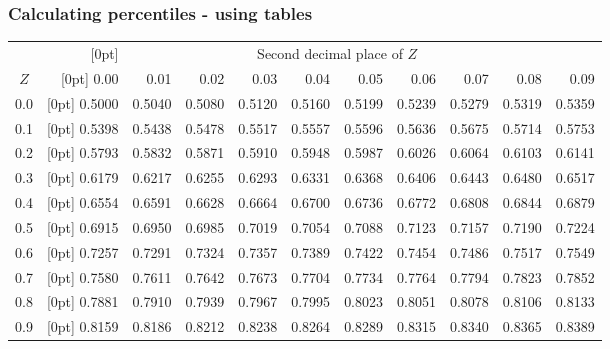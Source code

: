
\begin{frame}[fragile]
\frametitle{Calculating percentiles - using tables}

{\footnotesize
\begin{tabular}{c | >{\columncolor[gray]{0.6}[0pt]}rrrrr | rrrrr |}
  \cline{2-11}
&&&& \multicolumn{4}{c}{Second decimal place of $Z$} &&& \\
  \cline{2-11}
$Z$ & 0.00 & 0.01 & 0.02 & 0.03 & 0.04 & 0.05 & 0.06 & 0.07 & 0.08 & 0.09 \\
  \hline
  \hline
0.0 & \tiny{0.5000} & \tiny{0.5040} & \tiny{0.5080} & \tiny{0.5120} & \tiny{0.5160} & \tiny{0.5199} & \tiny{0.5239} & \tiny{0.5279} & \tiny{0.5319} & \tiny{0.5359} \\
  0.1 & \tiny{0.5398} & \tiny{0.5438} & \tiny{0.5478} & \tiny{0.5517} & \tiny{0.5557} & \tiny{0.5596} & \tiny{0.5636} & \tiny{0.5675} & \tiny{0.5714} & \tiny{0.5753} \\
  0.2 & \tiny{0.5793} & \tiny{0.5832} & \tiny{0.5871} & \tiny{0.5910} & \tiny{0.5948} & \tiny{0.5987} & \tiny{0.6026} & \tiny{0.6064} & \tiny{0.6103} & \tiny{0.6141} \\
  0.3 & \tiny{0.6179} & \tiny{0.6217} & \tiny{0.6255} & \tiny{0.6293} & \tiny{0.6331} & \tiny{0.6368} & \tiny{0.6406} & \tiny{0.6443} & \tiny{0.6480} & \tiny{0.6517} \\
  0.4 & \tiny{0.6554} & \tiny{0.6591} & \tiny{0.6628} & \tiny{0.6664} & \tiny{0.6700} & \tiny{0.6736} & \tiny{0.6772} & \tiny{0.6808} & \tiny{0.6844} & \tiny{0.6879} \\
  \hline
  0.5 & \tiny{0.6915} & \tiny{0.6950} & \tiny{0.6985} & \tiny{0.7019} & \tiny{0.7054} & \tiny{0.7088} & \tiny{0.7123} & \tiny{0.7157} & \tiny{0.7190} & \tiny{0.7224} \\
  0.6 & \tiny{0.7257} & \tiny{0.7291} & \tiny{0.7324} & \tiny{0.7357} & \tiny{0.7389} & \tiny{0.7422} & \tiny{0.7454} & \tiny{0.7486} & \tiny{0.7517} & \tiny{0.7549} \\
  0.7 & \tiny{0.7580} & \tiny{0.7611} & \tiny{0.7642} & \tiny{0.7673} & \tiny{0.7704} & \tiny{0.7734} & \tiny{0.7764} & \tiny{0.7794} & \tiny{0.7823} & \tiny{0.7852} \\
  0.8 & \tiny{0.7881} & \tiny{0.7910} & \tiny{0.7939} & \tiny{0.7967} & \tiny{0.7995} & \tiny{0.8023} & \tiny{0.8051} & \tiny{0.8078} & \tiny{0.8106} & \tiny{0.8133} \\
  0.9 & \tiny{0.8159} & \tiny{0.8186} & \tiny{0.8212} & \tiny{0.8238} & \tiny{0.8264} & \tiny{0.8289} & \tiny{0.8315} & \tiny{0.8340} & \tiny{0.8365} & \tiny{0.8389} \\

\end{tabular}}
\end{frame}
